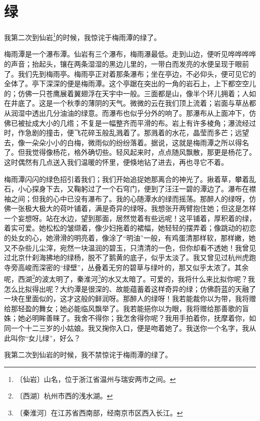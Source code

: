 \documentclass[12pt,UTF-8,openany]{ctexbook}
\begin{document}
\chapter{绿}

\begin{normalsize}
    
    我第二次到仙岩\footnote{〔仙岩〕山名，位于浙江省温州与瑞安两市之间。}的时候，我惊诧于梅雨潭的绿了。
    
    梅雨潭是一个瀑布潭。仙岩有三个瀑布，梅雨瀑最低。走到山边，便听见哗哗哗哗的声音；抬起头，镶在两条湿湿的黑边儿里的，一带白而发亮的水便呈现于眼前了。我们先到梅雨亭。梅雨亭正对着那条瀑布；坐在亭边，不必仰头，便可见它的全体了。亭下深深的便是梅雨潭。这个亭踞在突出的一角的岩石上，上下都空空儿的；仿佛一只苍鹰展着翼翅浮在天宇中一般。三面都是山，像半个环儿拥着；人如在井底了。这是一个秋季的薄阴的天气。微微的云在我们顶上流着；岩面与草丛都从润湿中透出几分油油的绿意。而瀑布也似乎分外的响了。那瀑布从上面冲下，仿佛已被扯成大小的几绺；不复是一幅整齐而平滑的布。岩上有许多棱角；瀑流经过时，作急剧的撞击，便飞花碎玉般乱溅着了。那溅着的水花，晶莹而多芒；远望去，像一朵朵小小的白梅，微雨似的纷纷落着。据说，这就是梅雨潭之所以得名了。但我觉得像杨花，格外确切些。轻风起来时，点点随风飘散，那更是杨花了。这时偶然有几点送入我们温暖的怀里，便倏地钻了进去，再也寻它不着。
    
    梅雨潭闪闪的绿色招引着我们；我们开始追捉她那离合的神光了。揪着草，攀着乱石，小心探身下去，又鞠躬过了一个石穹门，便到了汪汪一碧的潭边了。瀑布在襟袖之间；但我的心中已没有瀑布了。我的心随潭水的绿而摇荡。那醉人的绿呀，仿佛一张极大极大的荷叶铺着，满是奇异的绿呀。我想张开两臂抱住她；但这是怎样一个妄想呀。站在水边，望到那面，居然觉着有些远呢！这平铺着，厚积着的绿，着实可爱。她松松的皱缬着，像少妇拖着的裙幅，她轻轻的摆弄着；像跳动的初恋的处女的心，她滑滑的明亮着，像涂了“明油”一般，有鸡蛋清那样软，那样嫩，她又不杂些儿尘滓，宛然一块温润的碧玉，只清清的一色，但你却看不透她！我曾见过北京什刹海拂地的绿杨，脱不了鹅黄的底子，似乎太淡了。我又曾见过杭州虎跑寺旁高峻而深密的“绿壁”，丛叠着无穷的碧草与绿叶的，那又似乎太浓了。其余呢，西湖\footnote{〔西湖〕杭州市西的浅水湖。}的波太明了，秦淮河\footnote{〔秦淮河〕在江苏省西南部，经南京市区西入长江。}的水又太暗了。可爱的，我将什么来比拟你呢？我怎么比拟得出呢？大约潭是很深的、故能蕴蓄着这样奇异的绿；仿佛蔚蓝的天融了一块在里面似的，这才这般的鲜润呀。那醉人的绿呀！我若能裁你以为带，我将赠给那轻盈的舞女；她必能临风飘举了。我若能挹你以为眼，我将赠给那善歌的盲姝；她必明眸善睐了。我舍不得你；我怎舍得你呢？我用手拍着你，抚摩着你，如同一个十二三岁的小姑娘。我又掬你入口，便是吻着她了。我送你一个名字，我从此叫你“女儿绿”，好么？
    
    我第二次到仙岩的时候，我不禁惊诧于梅雨潭的绿了。
    
\end{normalsize}
\end{document}

